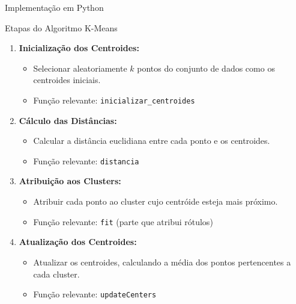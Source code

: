 \documentclass{beamer}
\begin{document}
\begin{frame}
    \centering
    \huge
    Implementação em Python 
\end{frame}

\begin{frame}{Etapas do Algoritmo K-Means}
    \begin{enumerate}
        \item \textbf{Inicialização dos Centroides:}
        \begin{itemize}
            \item Selecionar aleatoriamente \( k \) pontos do conjunto de dados como os centroides iniciais.
            \item Função relevante: \texttt{inicializar\_centroides}
        \end{itemize}

        \vspace{0.3cm}

        \item \textbf{Cálculo das Distâncias:}
        \begin{itemize}
            \item Calcular a distância euclidiana entre cada ponto e os centroides.
            \item Função relevante: \texttt{distancia}
        \end{itemize}

        \vspace{0.3cm}

        \item \textbf{Atribuição aos Clusters:}
        \begin{itemize}
            \item Atribuir cada ponto ao cluster cujo centróide esteja mais próximo.
            \item Função relevante: \texttt{fit} (parte que atribui rótulos)
        \end{itemize}

        \vspace{0.3cm}

        \item \textbf{Atualização dos Centroides:}
        \begin{itemize}
            \item Atualizar os centroides, calculando a média dos pontos pertencentes a cada cluster.
            \item Função relevante: \texttt{updateCenters}
        \end{itemize}


\end{enumerate}
\end{frame}
\end{document}
